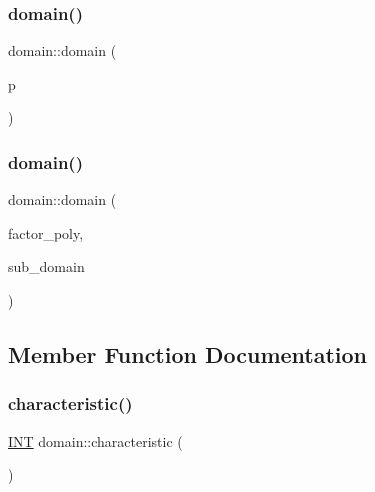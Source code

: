 \subsubsection{\texorpdfstring{domain()}{domain()}\hspace{0.1cm}{\footnotesize\ttfamily [1/2]}}
{\footnotesize\ttfamily domain\+::domain (\begin{DoxyParamCaption}\item[{\mbox{\hyperlink{galois_8h_a09fddde158a3a20bd2dcadb609de11dc}{I\+NT}}}]{p }\end{DoxyParamCaption})}

\mbox{\label{classdomain_af04c8d8404655de03d6dadfe9294d7dc}} 
\subsubsection{\texorpdfstring{domain()}{domain()}\hspace{0.1cm}{\footnotesize\ttfamily [2/2]}}
{\footnotesize\ttfamily domain\+::domain (\begin{DoxyParamCaption}\item[{\mbox{\hyperlink{classunipoly}{unipoly}} $\ast$}]{factor\+\_\+poly,  }\item[{\mbox{\hyperlink{classdomain}{domain}} $\ast$}]{sub\+\_\+domain }\end{DoxyParamCaption})}



\subsection{Member Function Documentation}
\mbox{\label{classdomain_a821a7f119bb67776aa0521253a98e65c}} 
\subsubsection{\texorpdfstring{characteristic()}{characteristic()}}
{\footnotesize\ttfamily \mbox{\hyperlink{galois_8h_a09fddde158a3a20bd2dcadb609de11dc}{I\+NT}} domain\+::characteristic (\begin{DoxyParamCaption}{ }\end{DoxyParamCaption})}

\mbox{\label{classdomain_a0c219e2d6db2f8f4e39e270b14a85d22}} 

